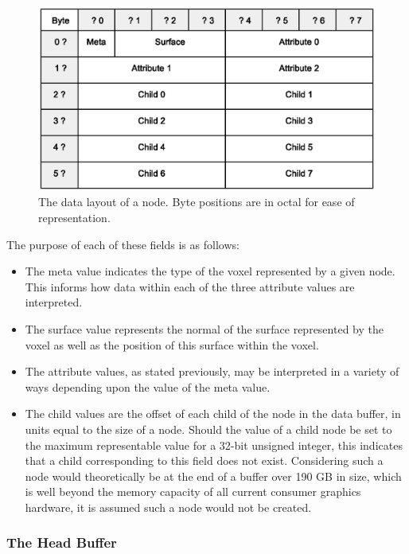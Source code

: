 \documentclass[onecolumn, draftclsnofoot,10pt, compsoc]{IEEEtran}
\begin{document}
\begin{figure}[H]
\begin{center}
\includegraphics[width=\textwidth, viewport=50 120 475 380, clip=true]{nodeLayout.eps}
\caption{The data layout of a node. Byte positions are in octal for ease of representation.}
\end{center}
\end{figure}

The purpose of each of these fields is as follows:

\begin{itemize}

\item The meta value indicates the type of the voxel represented by a given node. This informs how data within each of the three attribute values are interpreted.
\item The surface value represents the normal of the surface represented by the voxel as well as the position of this surface within the voxel.
\item The attribute values, as stated previously, may be interpreted in a variety of ways depending upon the value of the meta value.
\item The child values are the offset of each child of the node in the data buffer, in units equal to the size of a node. Should the value of a child node be set to the maximum representable value for a 32-bit unsigned integer, this indicates that a child corresponding to this field does not exist. Considering such a node would theoretically be at the end of a buffer over 190 GB in size, which is well beyond the memory capacity of all current consumer graphics hardware, it is assumed such a node would not be created.
\end{itemize}


\subsubsection{The Head Buffer}
\end{document}
